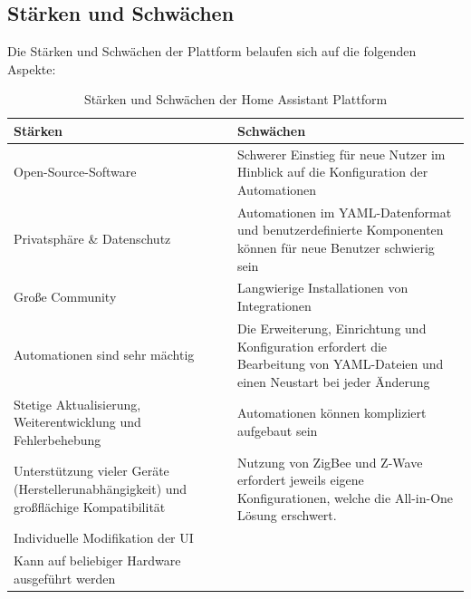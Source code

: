 
\subsection{Stärken und Schwächen}
    Die Stärken und Schwächen der Plattform belaufen sich auf die folgenden Aspekte:
    \begin{table}[hbt!]
        \begin{center}
            \begin{tabular}{| p{7.875cm} | p{7.875cm} | }
                \hline
                    \textbf{Stärken} & \textbf{Schwächen} \\
                \hline
                    Open-Source-Software & Schwerer Einstieg für neue Nutzer im Hinblick auf die Konfiguration der Automationen \\ 
                \hline
                    Privatsphäre \& Datenschutz & Automationen im YAML-Datenformat und benutzerdefinierte Komponenten können für neue Benutzer schwierig sein \\ 
                \hline
                    Große Community & Langwierige Installationen von Integrationen \\ 
                \hline
                    Automationen sind sehr mächtig & Die Erweiterung, Einrichtung und Konfiguration erfordert die Bearbeitung von YAML-Dateien und einen Neustart bei jeder Änderung \\ 
                \hline
                    Stetige Aktualisierung, Weiterentwicklung und Fehlerbehebung & Automationen können kompliziert aufgebaut sein \\ %
                \hline 
                    Unterstützung vieler Geräte (Herstellerunabhängigkeit) und großflächige Kompatibilität & Nutzung von ZigBee und Z-Wave erfordert jeweils eigene Konfigurationen, welche die All-in-One Lösung erschwert. \\
                \hline
                    Individuelle Modifikation der UI &  \\ 
                \hline
                    Kann auf beliebiger Hardware ausgeführt werden &  \\
                \hline
            \end{tabular}
        \end{center}
        \caption{Stärken und Schwächen der Home Assistant Plattform}
        \label{tab:prosConsHAOS}
    \end{table}
